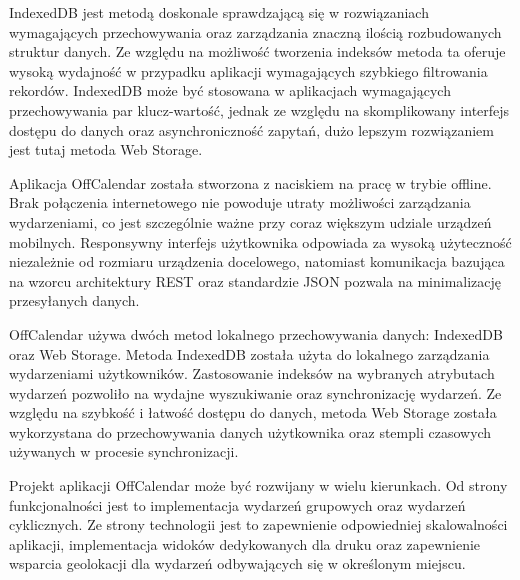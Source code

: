 IndexedDB jest metodą doskonale sprawdzającą się w rozwiązaniach wymagających przechowywania oraz zarządzania znaczną ilością rozbudowanych struktur danych. Ze względu na możliwość tworzenia indeksów metoda ta oferuje wysoką wydajność w przypadku aplikacji wymagających szybkiego filtrowania rekordów. IndexedDB może być stosowana w aplikacjach wymagających przechowywania par klucz-wartość, jednak ze względu na skomplikowany interfejs dostępu do danych oraz asynchroniczność zapytań, dużo lepszym rozwiązaniem jest tutaj metoda Web Storage.

Aplikacja OffCalendar została stworzona z naciskiem na pracę w trybie offline. Brak połączenia internetowego nie powoduje utraty możliwości zarządzania wydarzeniami, co jest szczególnie ważne przy coraz większym udziale urządzeń mobilnych. Responsywny interfejs użytkownika odpowiada za wysoką użyteczność niezależnie od rozmiaru urządzenia docelowego, natomiast komunikacja bazująca na wzorcu architektury REST oraz standardzie JSON pozwala na minimalizację przesyłanych danych.

OffCalendar używa dwóch metod lokalnego przechowywania danych: IndexedDB oraz Web Storage. Metoda IndexedDB została użyta do lokalnego zarządzania wydarzeniami użytkowników. Zastosowanie indeksów na wybranych atrybutach wydarzeń pozwoliło na wydajne wyszukiwanie oraz synchronizację wydarzeń. Ze względu na szybkość i łatwość dostępu do danych, metoda Web Storage została wykorzystana do przechowywania danych użytkownika oraz stempli czasowych używanych w procesie synchronizacji.

Projekt aplikacji OffCalendar może być rozwijany w wielu kierunkach. Od strony funkcjonalności jest to implementacja wydarzeń grupowych oraz wydarzeń cyklicznych. Ze strony technologii jest to zapewnienie odpowiedniej skalowalności aplikacji, implementacja widoków dedykowanych dla druku oraz zapewnienie wsparcia geolokacji dla wydarzeń odbywających się w określonym miejscu.